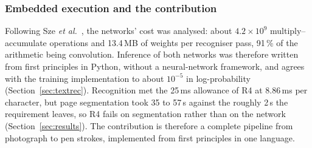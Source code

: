 \subsubsection{Embedded execution and the contribution}

Following Sze \emph{et al.}~\cite{sze2017}, the networks' cost was analysed: about $4.2\times10^{9}$ multiply--accumulate operations and 13.4\,MB of weights per recogniser pass, 91\,\% of the arithmetic being convolution.
Inference of both networks was therefore written from first principles in Python, without a neural-network framework, and agrees with the training implementation to about $10^{-5}$ in log-probability (Section~\ref{sec:textrec}).
Recognition met the 25\,ms allowance of R4 at 8.86\,ms per character, but page segmentation took 35 to 57\,s against the roughly 2\,s the requirement leaves, so R4 fails on segmentation rather than on the network (Section~\ref{sec:results}).
The contribution is therefore a complete pipeline from photograph to pen strokes, implemented from first principles in one language.
